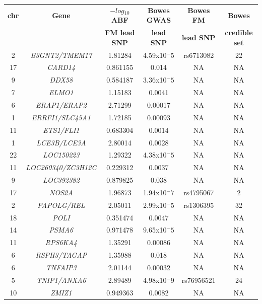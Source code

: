 \begin{table}[htbp]
\centering
\begin{tabular}{@{} c c c c c c}
\toprule
\textbf{chr} & \textbf{Gene} & \textbf{$-log{_10}$ABF} & \textbf{Bowes GWAS} & \textbf{Bowes FM} & \textbf{Bowes} \\
             &               & \textbf{FM lead SNP}   & \textbf{lead SNP}   & \textbf{lead SNP} & \textbf{credible set} \\
\midrule
\midrule
2	 & \textit{B3GNT2/TMEM17} & 1.81284	 & 4.59x10${^-5}$ & rs6713082	& 22 \\
17 & \textit{CARD14}	       & 0.861155	 & 0.014 & NA	& NA \\
9	 & \textit{DDX58}	       &	0.584187 & 3.36x10${^-5}$ &	NA	&NA \\
7	 & \textit{ELMO1}	       &	1.15183	 & 0.0041 &	NA	& NA \\
6	 & \textit{ERAP1/ERAP2}	 &	2.71299	 & 0.00017 &	NA	&NA \\
1	 & \textit{ERRFI1/SLC45A1}	&	1.72185	 &	0.00093 & NA	& NA \\
11 & \textit{ETS1/FLI1}	   &	0.683304 & 0.0014	& NA  &	NA \\ 
1	 & \textit{LCE3B/LCE3A}	 &	2.80014	 & 0.0028	& NA	& NA \\
22 & \textit{LOC150223}	   &	1.29322	 & 4.38x10${^-5}$	& NA	& NA \\
11 & \textit{LOC260340/ZC3H12C}	&	0.229312	&  0.0037 &	NA &	NA \\
9	 & \textit{LOC392382}	   &	0.879825	&	0.038  & NA	& NA \\
17 & \textit{NOS2A}	       &	1.96873	 & 1.94x10${^-7}$	& rs4795067 &	2 \\
2	 & \textit{PAPOLG/REL}	   &	2.05011	 & 2.99x10${^-5}$ &	rs1306395	& 32 \\
18 & \textit{POLI}	       &	0.351474 & 0.0047	& NA &	NA \\
14 & \textit{PSMA6}	&	0.971478	& 9.65x10${^-5}$ &	NA &	NA \\
11 & \textit{RPS6KA4}	     &	1.35291	 & 0.00086 &	NA	& NA \\
6	 & \textit{RSPH3/TAGAP}	 &	1.35988  & 0.018	&	NA	& NA \\
6	 & \textit{TNFAIP3}	     &	2.01144	 & 0.00032	& NA	& NA \\
5	 & \textit{TNIP1/ANXA6}	 &	2.89489	 & 4.98x10${^-9}$ &	rs76956521	& 24 \\
10 & \textit{ZMIZ1}	       &	0.949363 & 0.0082	& NA &	NA \\

\end{tabular}
\end{table}
